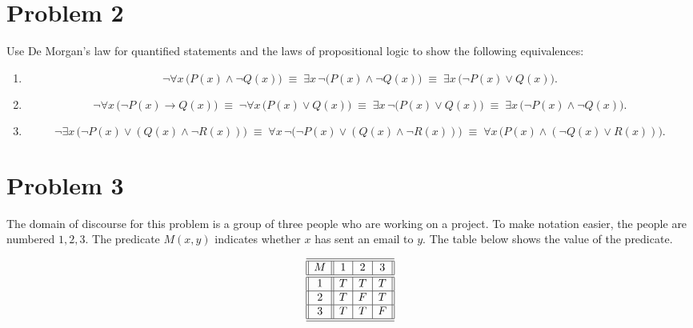 \documentclass{amsart}
\theoremstyle{definition}
\theoremstyle{Exercise}
\theoremstyle{remark}
\theoremstyle{rule}
\numberwithin{equation}{section}
\begin{document}
\newpage

\section*{Problem 2}
Use De Morgan's law for quantified statements and the laws of propositional logic to show the following equivalences:
\begin{enumerate}[label=(\alph*)]

\item 
\[
  \neg \forall x \,\bigl(P(x)\land \neg Q(x)\bigr)
  \;\equiv\;
  \exists x\,\neg\bigl(P(x)\land \neg Q(x)\bigr)
  \;\equiv\;
  \exists x\,\bigl(\neg P(x)\lor Q(x)\bigr).
\]

\item 
\[
  \neg \forall x \,\bigl(\neg P(x)\to Q(x)\bigr)
  \;\equiv\;
  \neg \forall x \,\bigl(P(x)\lor Q(x)\bigr)
  \;\equiv\;
  \exists x\,\neg\bigl(P(x)\lor Q(x)\bigr)
  \;\equiv\;
  \exists x\,\bigl(\neg P(x)\land \neg Q(x)\bigr).
\]

\item 
\[
  \neg \exists x \,\bigl(\neg P(x)\lor (Q(x)\land \neg R(x))\bigr)
  \;\equiv\;
  \forall x\,\neg\bigl(\neg P(x)\lor (Q(x)\land \neg R(x))\bigr)
  \;\equiv\;
  \forall x\,\bigl(P(x)\land (\neg Q(x)\lor R(x))\bigr).
\]

\end{enumerate}

\newpage

\section*{Problem 3}
The domain of discourse for this problem is a group of three people who are working on a project. To make notation easier, the people are numbered $1,2,3$. The predicate $M(x,y)$ indicates whether $x$ has sent an email to $y$. The table below shows the value of the predicate.

\[
 \begin{array}{||c||c|c|c||}
\hline\hline
M & 1 & 2 & 3\\
\hline\hline
1 & T & T & T\\
\hline
2 & T & F & T\\
\hline
3 & T & T & F\\
\hline\hline
\end{array}
\]
\end{document}
